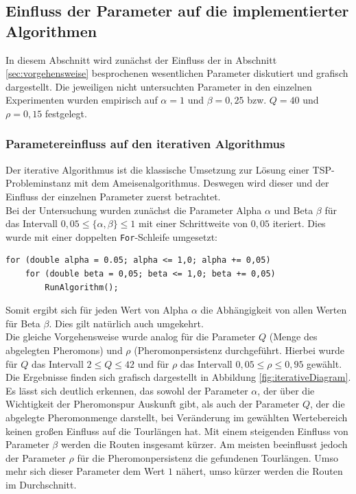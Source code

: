 \documentclass[doktyp=barbeit, sprache=german]{TUBAFarbeiten}
\begin{document}
\subsection{Einfluss der Parameter auf die implementierter Algorithmen}
\label{sec:einflussparameter}
In diesem Abschnitt wird zunächst der Einfluss der in Abschnitt \ref{sec:vorgehensweise} besprochenen wesentlichen Parameter diskutiert und grafisch dargestellt. Die jeweiligen nicht untersuchten Parameter in den einzelnen Experimenten wurden empirisch auf $\alpha = 1$ und $\beta = 0,25$ bzw. $Q = 40$ und $\rho = 0,15$ festgelegt.
\subsubsection{Parametereinfluss auf den iterativen Algorithmus}
Der iterative Algorithmus ist die klassische Umsetzung zur Lösung einer TSP-Probleminstanz mit dem Ameisenalgorithmus. Deswegen wird dieser und der Einfluss der einzelnen Parameter zuerst betrachtet. \\Bei der Untersuchung wurden zunächst die Parameter Alpha $\alpha$ und Beta $\beta$ für das Intervall $0,05 \leq \{\alpha,\beta\} \leq 1$ mit einer Schrittweite von $0,05$ iteriert. Dies wurde mit einer doppelten \texttt{For}-Schleife umgesetzt:
\begin{lstlisting}
for (double alpha = 0.05; alpha <= 1,0; alpha += 0,05)
	for (double beta = 0,05; beta <= 1,0; beta += 0,05) 
		RunAlgorithm();
\end{lstlisting}
Somit ergibt sich für jeden Wert von Alpha $\alpha$ die Abhängigkeit von allen Werten für Beta $\beta$. Dies gilt natürlich auch umgekehrt.
\\Die gleiche Vorgehensweise wurde analog für die Parameter $Q$ (Menge des abgelegten Pheromons) und $\rho$ (Pheromonpersistenz durchgeführt.
Hierbei wurde für $Q$ das Intervall $2 \leq Q \leq 42$ und für $\rho$ das Intervall $0,05 \leq \rho \leq 0,95$ gewählt.
\\Die Ergebnisse finden sich grafisch dargestellt in Abbildung \ref{fig:iterativeDiagram}. Es lässt sich deutlich erkennen, das sowohl der Parameter $\alpha$, der über die Wichtigkeit der Pheromonspur Auskunft gibt, als auch der Parameter $Q$, der die abgelegte Pheromonmenge darstellt, bei Veränderung im gewählten Wertebereich keinen großen Einfluss auf die Tourlängen hat. Mit einem steigenden Einfluss von Parameter $\beta$ werden die Routen insgesamt kürzer. Am meisten beeinflusst jedoch der Parameter $\rho$ für die Pheromonpersistenz die gefundenen Tourlängen. Umso mehr sich dieser Parameter dem Wert $1$ nähert, umso kürzer werden die Routen im Durchschnitt.
\end{document}
